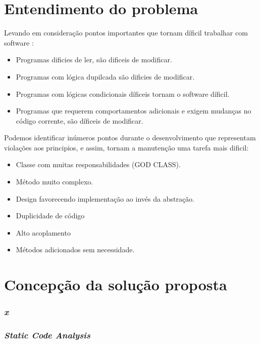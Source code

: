 \documentclass[12pt]{article}
\begin{document}
\part{Entendimento do problema} \label{sec:problema}

Levando em consideração pontos importantes que tornam díficil trabalhar com software \cite{MARTIN_FOWLER_REFACTORING}:

\begin{itemize}
 \item Programas dificies de ler, são dificeis de modificar.
 \item Programas com lógica dupilcada são dificies de modificar.
 \item Programas com lógicas condicionais díficeis tornam o software díficil.
 \item Programas que requerem comportamentos adicionais e exigem mudanças no código corrente, são díficeis de modificar.
\end{itemize} 

Podemos identificar inúmeros pontos durante o desenvolvimento que representam violações aos principios, e assim, tornam a manutenção uma tarefa mais dificil:

\begin{itemize}
 \item Classe com muitas responsabilidades (GOD CLASS).
 \item Método muito complexo.
 \item Design favorecendo implementação ao invés da abstração.
 \item Duplicidade de código
 \item Alto acoplamento
 \item Métodos adicionados sem necessidade.
\end{itemize} 
	
\part{Concepção da solução proposta} \label{sec:concepcao}


\section{\textit{x}} \label{sec:x}


\section{\textit{Static Code Analysis}} \label{sec:managecodequality}
\end{document}
